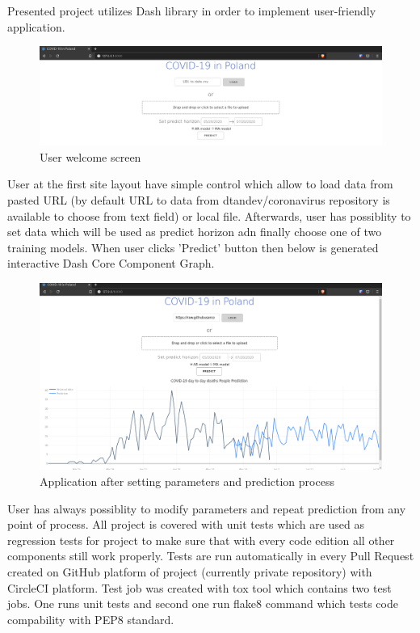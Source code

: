 \documentclass[conference]{IEEEtran}
\begin{document}
Presented project utilizes Dash library in order to implement user-friendly application.
\begin{figure}[h!]
    \includegraphics[width=\linewidth]{images/gui1.png}
    \caption{User welcome screen}
    \label{fig:gui1}
\end{figure}
\newline
User at the first site layout have simple control which allow to load data from pasted URL (by default URL to data from dtandev/coronavirus repository is available to choose from text field) or local file.
Afterwards, user has possiblity to set data which will be used as predict horizon adn finally choose one of two training models.
\newline
When user clicks 'Predict' button then below is generated interactive Dash Core Component Graph.
\begin{figure}[h!]
    \includegraphics[width=\linewidth]{images/gui2.png}
    \caption{Application after setting parameters and prediction process}
    \label{fig:gui2}
\end{figure}
\newline
User has always possiblity to modify parameters and repeat prediction from any point of process.
\newline
\newline
All project is covered with unit tests which are used as regression tests for project to make sure that with every code edition all other components still work properly.
Tests are run automatically in every Pull Request created on GitHub platform of project (currently private repository) with CircleCI platform.
Test job was created with tox tool which contains two test jobs.
One runs unit tests and second one run flake8 command which tests code compability with PEP8 standard.
\end{document}
